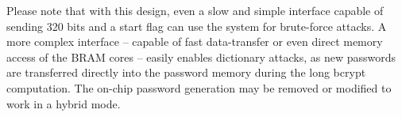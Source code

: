 
Please note that with this design, even a slow and simple interface capable of
sending 320 bits and a start flag can use the system for brute-force attacks.
A more complex interface -- capable of fast data-transfer or even direct memory
access of the BRAM cores -- easily enables dictionary attacks, as new
passwords are transferred directly into the password memory during the long
bcrypt computation. The on-chip password generation may be removed or modified
to work in a hybrid mode.
